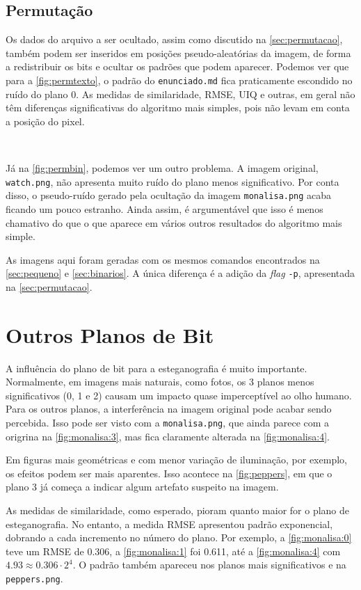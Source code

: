 \subsection{Permutação}

    Os dados do arquivo a ser ocultado, assim como discutido na \cref{sec:permutacao}, também podem ser inseridos em posições pseudo-aleatórias da imagem, de forma a redistribuir os bits e ocultar os padrões que podem aparecer. Podemos ver que para a \cref{fig:permtexto}, o padrão do \texttt{enunciado.md} fica praticamente escondido no ruído do plano 0. As medidas de similaridade, RMSE, UIQ e outras, em geral não têm diferenças significativas do algoritmo mais simples, pois não levam em conta a posição do pixel.

    ~

    

    Já na \cref{fig:permbin}, podemos ver um outro problema. A imagem original, \texttt{watch.png}, não apresenta muito ruído do plano menos significativo. Por conta disso, o pseudo-ruído gerado pela ocultação da imagem \texttt{monalisa.png} acaba ficando um pouco estranho. Ainda assim, é argumentável que isso é menos chamativo do que o que aparece em vários outros resultados do algoritmo mais simple.

    As imagens aqui foram geradas com os mesmos comandos encontrados na \cref{sec:pequeno} e \cref{sec:binarios}. A única diferença é a adição da \textit{flag} \texttt{-p}, apresentada na \cref{sec:permutacao}.

    

\section{Outros Planos de Bit}

    A influência do plano de bit para a esteganografia é muito importante. Normalmente, em imagens mais naturais, como fotos, os 3 planos menos significativos (0, 1 e 2) causam um impacto quase imperceptível ao olho humano. Para os outros planos, a interferência na imagem original pode acabar sendo percebida. Isso pode ser visto com a \texttt{monalisa.png}, que ainda parece com a origrina na \cref{fig:monalisa:3}, mas fica claramente alterada na \cref{fig:monalisa:4}.

    

    Em figuras mais geométricas e com menor variação de iluminação, por exemplo, os efeitos podem ser mais aparentes. Isso acontece na \cref{fig:peppers}, em que o plano 3 já começa a indicar algum artefato suspeito na imagem.

    As medidas de similaridade, como esperado, pioram quanto maior for o plano de esteganografia. No entanto, a medida RMSE apresentou padrão exponencial, dobrando a cada incremento no número do plano. Por exemplo, a \cref{fig:monalisa:0} teve um RMSE de 0.306, a \cref{fig:monalisa:1} foi 0.611, até a \cref{fig:monalisa:4} com $4.93 \approx 0.306 \cdot 2^4$. O padrão também apareceu nos planos mais significativos e na \texttt{peppers.png}.

    
